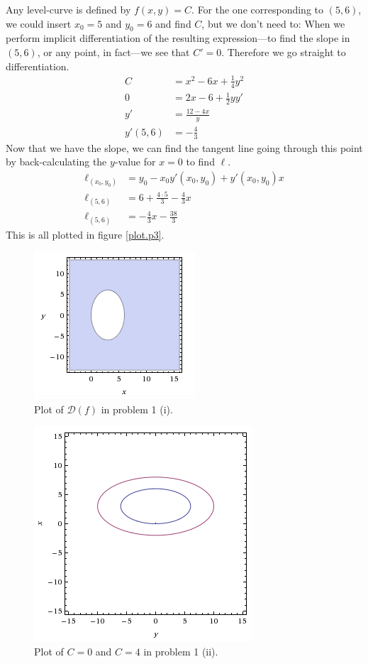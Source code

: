 \documentclass[a4paper,norsk,12pt]{article}
\begin{document}
Any level-curve is defined by $f(x,y)=C$. For the one corresponding to $(5,6)$,
we could insert $x_0=5$ and $y_0=6$ and find $C$, but we don't need to: When we
perform implicit differentiation of the resulting expression---to find the
slope in $(5,6)$, or any point, in fact---we see that $C'=0$. Therefore we go
straight to differentiation.
\begin{align*}
  C &= x^2 - 6x + \frac{1}{4}y^2 \\
  0 &= 2x - 6 + \frac{1}{2}yy' \\
  y' &= \frac{12-4x}{y} \\
  y'(5,6) &= -\frac{4}{3}
\end{align*}
Now that we have the slope, we can find the tangent line going through this
point by back-calculating the $y$-value for $x=0$ to find $\ell$.
\begin{align*}
  \ell_{(x_0, y_0)} &= y_0 - x_0y'(x_0,y_0) + y'(x_0,y_0)x \\
  \ell_{(5,6)} &= 6+\frac{4\cdot5}{3} -\frac{4}{3}x \\
  \ell_{(5,6)} &= -\frac{4}{3}x -\frac{38}{3}
\end{align*}
This is all plotted in figure \vref{plot.p3}.

\begin{figure}[h]
  \centering
  \includegraphics{ob1plot.png}
  \caption{Plot of $\mathcal{D}(f)$ in problem 1 (i).}
  \label{plot.p1}
\end{figure}

\begin{figure}[h]
  \centering
  \includegraphics{ob1plot2.png}
  \caption{Plot of $C=0$ and $C=4$ in problem 1 (ii).}
  \label{plot.p2}
\end{figure}
\end{document}
